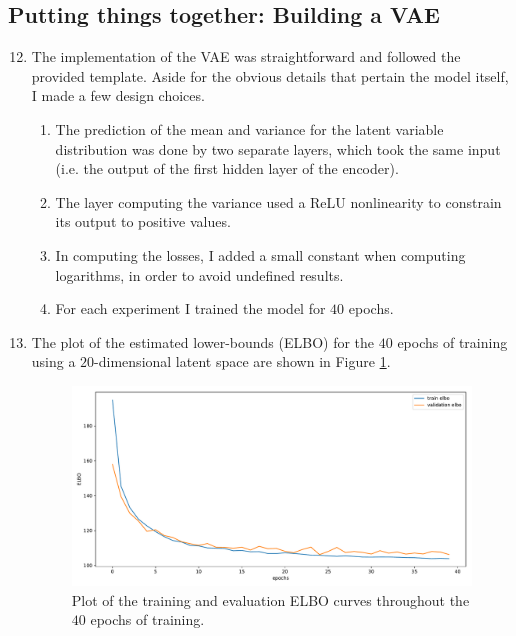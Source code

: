 \documentclass{article}
\begin{document}
\subsection{Putting things together: Building a VAE}

\begin{enumerate}[label=\textbf{1.\arabic*}]
  \setcounter{enumi}{11}
  \item
  The implementation of the VAE was straightforward and followed the provided template. Aside for the obvious details that pertain the model itself, I made a few design choices.

  \begin{enumerate}[label=\roman*.]
    \item The prediction of the mean and variance for the latent variable distribution was done by two separate layers, which took the same input (i.e. the output of the first hidden layer of the encoder).
    \item The layer computing the variance used a ReLU nonlinearity to constrain its output to positive values.
    \item In computing the losses, I added a small constant when computing logarithms, in order to avoid undefined results.
    \item For each experiment I trained the model for $40$ epochs.
  \end{enumerate}

  \item
  The plot of the estimated lower-bounds (ELBO) for the $40$ epochs of training using a $20$-dimensional latent space are shown in Figure \ref{fig:elbo}.

  \begin{figure}[ht]
      \centering
      \includegraphics[scale=0.4]{img/elbo.pdf}
      \caption{Plot of the training and evaluation ELBO curves throughout the $40$ epochs of training.}
      \label{fig:elbo}
  \end{figure}


\end{enumerate}
\end{document}
